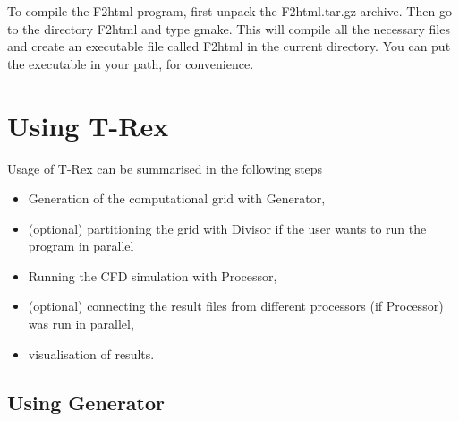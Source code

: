 \documentclass[10pt]{article}
\newcommand*{\tc}{\ttfamily} %
\newcommand*{\tn}{\sffamily} %
\begin{document}
    To compile the {\tn F2html} program, first unpack the 
    {\tc F2html.tar.gz} archive. Then go to the directory 
    {\tc F2html} and type {\tc gmake}. This will compile all
    the necessary files and create an executable file called
    {\tc F2html} in the current directory. You can put the
    executable in your path, for convenience.

%
    \newpage
    \section{Using {\tn T-Rex}}
%

    Usage of {\tn T-Rex} can be summarised in the following steps
    \begin{itemize}
      \item Generation of the computational grid with 
            {\tn Generator},
      \item (optional) partitioning the grid with {\tn Divisor}
            if the user wants to run the program in parallel
      \item Running the CFD simulation with {\tn Processor},
      \item (optional) connecting the result files from
            different processors (if {\tn Processor}) was run
            in parallel,
      \item visualisation of results. 
    \end{itemize}

%
    \subsection{Using {\tn Generator}}
    \label{Gen}
%
\end{document}
